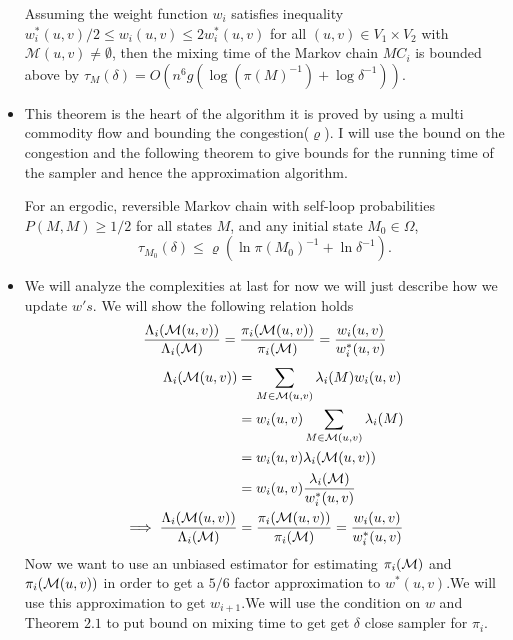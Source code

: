 \begin{itemize}
	\begin{theorem}
		 Assuming the weight function $w_i$ satisfies inequality $w_i^*(u,v)/2 \leq w_i(u,v) \leq 2w_i^*(u,v)$  for all $(u, v) \in V_1 \times V_2$ with $\mathcal{M}(u, v) \neq \emptyset$, then the mixing time of the Markov chain $M C_i$ is bounded above by $\tau_M(\delta)=O\left(n^6 g\left(\log \left(\pi(M)^{-1}\right)+\log \delta^{-1}\right)\right)$.
	\end{theorem}
\item \begin{flushleft}
	This theorem is the heart of the algorithm it is proved by using a multi commodity flow and bounding the congestion($\varrho$). I will use the bound on the congestion and the following theorem to give bounds for the running time of the sampler and hence the approximation algorithm.
	\begin{theorem}
		For an ergodic, reversible Markov chain with self-loop probabilities $P(M, M) \geq 1 / 2$ for all states $M$, and any initial state $M_0 \in \Omega$,
		$$
		\tau_{M_0}(\delta) \leq \varrho\left(\ln \pi\left(M_0\right)^{-1}+\ln \delta^{-1}\right) .
		$$
	\end{theorem}
\end{flushleft}
\item \begin{flushleft}
	We will analyze the complexities at last for now we will just describe how we update $w's$.
	We will show the following relation holds 
	$$\frac{\Lambda_i(\mathcal{M}(u,v))}{\Lambda_i(\mathcal{M})}=\frac{\pi_i(\mathcal{M}(u,v))}{\pi_i(\mathcal{M})}=\frac{w_i(u,v)}{w_i^*(u,v)}$$
	\begin{align*}
		\Lambda_i(\mathcal{M}(u,v))& =\sum_{M\in \mathcal{M}(u,v)}\lambda_i(M) w_i(u,v) \\
		& = w_i(u,v)\sum_{M\in \mathcal{M}(u,v)}\lambda_i(M)\\
		& = w_i(u,v)\lambda_i(\mathcal{M}(u,v))\\
		& = w_i(u,v)\frac{\lambda_i(\mathcal{M})}{w_i^*(u,v)}\\
		\implies \frac{\Lambda_i(\mathcal{M}(u,v))}{\Lambda_i(\mathcal{M})}& = \frac{\pi_i(\mathcal{M}(u,v))}{\pi_i(\mathcal{M})}=\frac{w_i(u,v)}{w_i^*(u,v)} 
	\end{align*}
Now we want to use an unbiased estimator for estimating $\pi_i(\mathcal{M})$ and $\pi_i(\mathcal{M}(u,v))$ 
in order to get a $5/6$ factor approximation to $w^*(u,v)$.We will use this approximation to get $w_{i+1}$.We will use the condition on $w$ and Theorem $2.1$ to put bound on mixing time to get get $\delta$ close sampler for $\pi_i$.
\end{flushleft}

\end{itemize}
